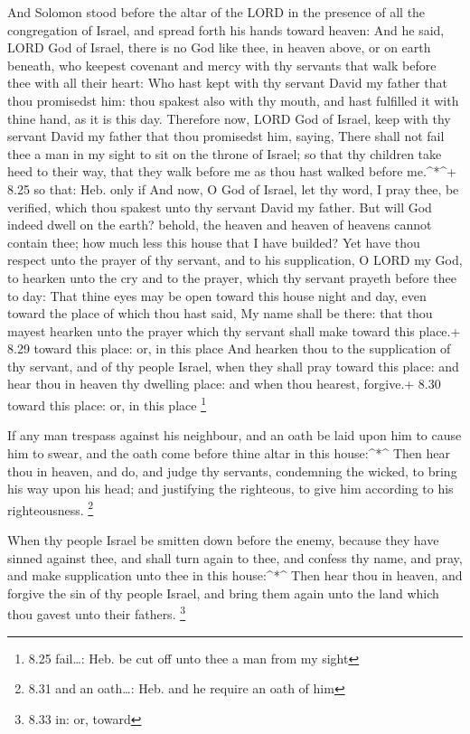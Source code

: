  And Solomon stood before the altar of the LORD in the
presence of all the congregation of Israel, and spread forth his hands
toward heaven:  And he said, LORD God of Israel, there is
no God like thee, in heaven above, or on earth beneath, who keepest
covenant and mercy with thy servants that walk before thee with all
their heart:  Who hast kept with thy servant David my
father that thou promisedst him: thou spakest also with thy mouth, and
hast fulfilled it with thine hand, as it is this day. 
Therefore now, LORD God of Israel, keep with thy servant David my father
that thou promisedst him, saying, There shall not fail thee a man in my
sight to sit on the throne of Israel; so that thy children take heed to
their way, that they walk before me as thou hast walked before
me.\^{}*\^{}+ 8.25 so that: Heb. only if  And now, O God of
Israel, let thy word, I pray thee, be verified, which thou spakest unto
thy servant David my father.  But will God indeed dwell on
the earth? behold, the heaven and heaven of heavens cannot contain thee;
how much less this house that I have builded?  Yet have
thou respect unto the prayer of thy servant, and to his supplication, O
LORD my God, to hearken unto the cry and to the prayer, which thy
servant prayeth before thee to day:  That thine eyes may be
open toward this house night and day, even toward the place of which
thou hast said, My name shall be there: that thou mayest hearken unto
the prayer which thy servant shall make toward this place.+ 8.29 toward
this place: or, in this place  And hearken thou to the
supplication of thy servant, and of thy people Israel, when they shall
pray toward this place: and hear thou in heaven thy dwelling place: and
when thou hearest, forgive.+ 8.30 toward this place: or, in this place
\footnote{8.25 fail\ldots: Heb. be cut off unto thee a man from my sight}

 If any man trespass against his neighbour, and an oath be
laid upon him to cause him to swear, and the oath come before thine
altar in this house:\^{}*\^{}  Then hear thou in heaven,
and do, and judge thy servants, condemning the wicked, to bring his way
upon his head; and justifying the righteous, to give him according to
his righteousness. \footnote{8.31 and an oath\ldots: Heb. and he require
  an oath of him}

 When thy people Israel be smitten down before the enemy,
because they have sinned against thee, and shall turn again to thee, and
confess thy name, and pray, and make supplication unto thee in this
house:\^{}*\^{}  Then hear thou in heaven, and forgive the
sin of thy people Israel, and bring them again unto the land which thou
gavest unto their fathers. \footnote{8.33 in: or, toward}

